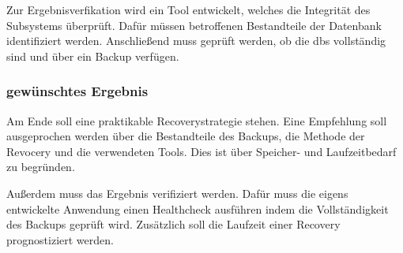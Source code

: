 Zur Ergebnisverfikation wird ein Tool entwickelt, welches die Integrität des Subsystems überprüft. Dafür müssen betroffenen Bestandteile der Datenbank identifiziert werden. Anschließend muss geprüft werden, ob die \acp{db} vollständig sind und über ein Backup verfügen.



\subsubsection{gewünschtes Ergebnis}
Am Ende soll eine praktikable Recoverystrategie stehen. Eine Empfehlung soll ausgeprochen werden über die Bestandteile des Backups, die Methode der Revocery und die verwendeten Tools. Dies ist über Speicher- und Laufzeitbedarf zu begründen.

Außerdem muss das Ergebnis verifiziert werden. Dafür muss die eigens entwickelte Anwendung einen Healthcheck ausführen indem die Vollständigkeit des Backups geprüft wird. Zusätzlich soll die Laufzeit einer Recovery prognostiziert werden.